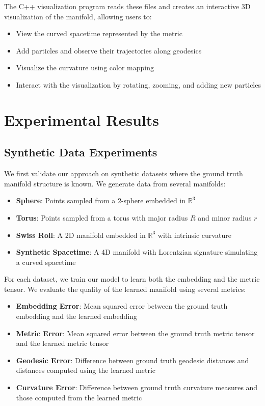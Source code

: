 \documentclass[11pt,a4paper]{article}
\begin{document}
The C++ visualization program reads these files and creates an interactive 3D visualization of the manifold, allowing users to:

\begin{itemize}
    \item View the curved spacetime represented by the metric
    \item Add particles and observe their trajectories along geodesics
    \item Visualize the curvature using color mapping
    \item Interact with the visualization by rotating, zooming, and adding new particles
\end{itemize}

\section{Experimental Results}
\subsection{Synthetic Data Experiments}

We first validate our approach on synthetic datasets where the ground truth manifold structure is known. We generate data from several manifolds:

\begin{itemize}
    \item \textbf{Sphere}: Points sampled from a 2-sphere embedded in $\mathbb{R}^3$
    \item \textbf{Torus}: Points sampled from a torus with major radius $R$ and minor radius $r$
    \item \textbf{Swiss Roll}: A 2D manifold embedded in $\mathbb{R}^3$ with intrinsic curvature
    \item \textbf{Synthetic Spacetime}: A 4D manifold with Lorentzian signature simulating a curved spacetime
\end{itemize}

For each dataset, we train our model to learn both the embedding and the metric tensor. We evaluate the quality of the learned manifold using several metrics:

\begin{itemize}
    \item \textbf{Embedding Error}: Mean squared error between the ground truth embedding and the learned embedding
    \item \textbf{Metric Error}: Mean squared error between the ground truth metric tensor and the learned metric tensor
    \item \textbf{Geodesic Error}: Difference between ground truth geodesic distances and distances computed using the learned metric
    \item \textbf{Curvature Error}: Difference between ground truth curvature measures and those computed from the learned metric
\end{itemize}
\end{document}
